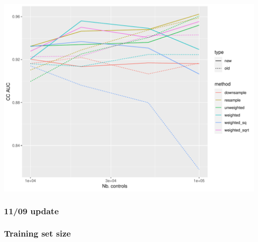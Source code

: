 \documentclass[12pt]{article}
\begin{document}
\begin{center}
\includegraphics[width=.9\textwidth]{aucs_large_cc_new.pdf}
\end{center}



\pagebreak
\subsubsection*{11/09 update}

\subsubsection*{Training set size}
\end{document}
